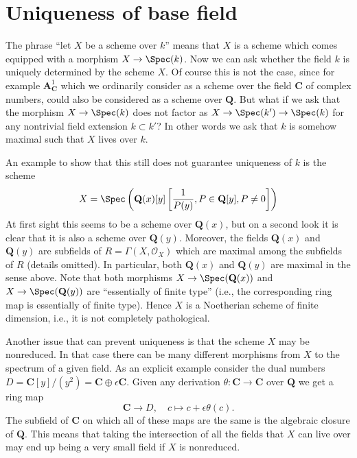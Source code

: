 \section{Uniqueness of base field}
\label{section-base-field}

\noindent
The phrase ``let $X$ be a scheme over $k$'' means that $X$ is a scheme
which comes equipped with a morphism $X \to \Spec(k)$. Now we can
ask whether the field $k$ is uniquely determined by the scheme $X$.
Of course this is not the case, since for example
$\mathbf{A}^1_{\mathbf{C}}$ which we ordinarily consider as a scheme
over the field $\mathbf{C}$ of complex numbers, could also be considered
as a scheme over $\mathbf{Q}$. But what if we ask that the morphism
$X \to \Spec(k)$ does not factor as
$X \to \Spec(k') \to \Spec(k)$ for any nontrivial field
extension $k \subset k'$? In other words we ask that $k$ is
somehow maximal such that $X$ lives over $k$.

\medskip\noindent
An example to show that this still does not guarantee uniqueness of $k$
is the scheme
$$
X =
\Spec\left(
\mathbf{Q}(x)[y]\left[\frac{1}{P(y)}, P \in \mathbf{Q}[y], P \not = 0\right]
\right)
$$
At first sight this seems to be a scheme over $\mathbf{Q}(x)$, but on a
second look it is clear that it is also a scheme over $\mathbf{Q}(y)$.
Moreover, the fields $\mathbf{Q}(x)$ and $\mathbf{Q}(y)$ are subfields
of $R = \Gamma(X, \mathcal{O}_X)$ which are maximal among the subfields
of $R$ (details omitted). In particular, both $\mathbf{Q}(x)$ and
$\mathbf{Q}(y)$ are maximal in the sense above. Note that both morphisms
$X \to \Spec(\mathbf{Q}(x))$
and $X \to \Spec(\mathbf{Q}(y))$ are ``essentially of finite type''
(i.e., the corresponding ring map is essentially of finite type).
Hence $X$ is a Noetherian scheme of finite dimension, i.e., it is
not completely pathological.

\medskip\noindent
Another issue that can prevent uniqueness is that the scheme $X$ may
be nonreduced. In that case there can be many different morphisms
from $X$ to the spectrum of a given field. As an explicit example consider
the dual numbers
$D = \mathbf{C}[y]/(y^2) = \mathbf{C} \oplus \epsilon \mathbf{C}$.
Given any derivation $\theta : \mathbf{C} \to \mathbf{C}$ over $\mathbf{Q}$
we get a ring map
$$
\mathbf{C} \longrightarrow D, \quad
c \longmapsto c + \epsilon \theta(c).
$$
The subfield of $\mathbf{C}$ on which all of these maps are the same
is the algebraic closure of $\mathbf{Q}$. This means that taking the
intersection of all the fields that $X$ can live over may end up
being a very small field if $X$ is nonreduced.

